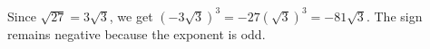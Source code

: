 Since $\sqrt{27}=3\sqrt3$, we get $(-3\sqrt3)^3=-27(\sqrt3)^3=\boxed{-81\sqrt3}$. The sign remains negative because the exponent is odd.
